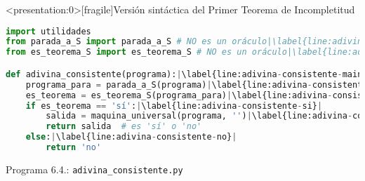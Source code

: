 \documentclass[10pt,xcolor=dvipsnames,aspectratio=169,spanish]{beamer}
\begin{document}
\begin{frame}<presentation:0>[fragile]{Versión sintáctica del Primer Teorema de Incompletitud}

\begin{lstlisting}[language=Python]
import utilidades
from parada_a_S import parada_a_S # NO es un oráculo|\label{line:adivina-consistente-import-1}|
from es_teorema_S import es_teorema_S # NO es un oráculo|\label{line:adivina-consistente-import-2}|

def adivina_consistente(programa):|\label{line:adivina-consistente-main}|
    programa_para = parada_a_S(programa)|\label{line:adivina-consistente-programa-para}|
    es_teorema = es_teorema_S(programa_para)|\label{line:adivina-consistente-es-teorema}|
    if es_teorema == 'sí':|\label{line:adivina-consistente-si}|
        salida = maquina_universal(programa, '')|\label{line:adivina-consistente-universal}|
        return salida  # es 'sí' o 'no'
    else:|\label{line:adivina-consistente-no}|
        return 'no'
\end{lstlisting}
\vspace*{-4mm}
\begin{center}
{\small Programa 6.4.: \texttt{adivina\_consistente.py}}
\end{center}

\vspace*{-9.5mm}

\hfill\square

\end{frame}
\end{document}
